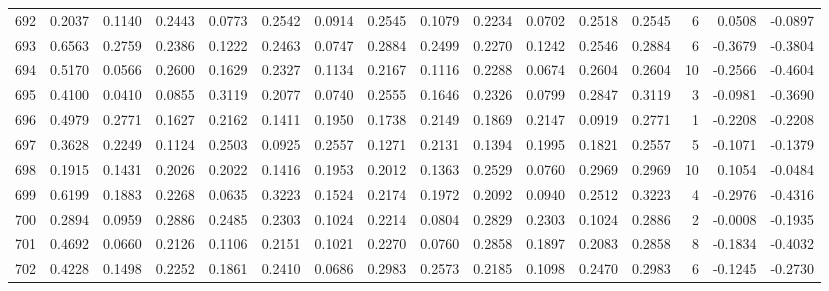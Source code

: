\begin{tabular}{lrrrrrrrrrrrrrrr}
692 &      0.2037 &  0.1140 &  0.2443 &  0.0773 &  0.2542 &  0.0914 &  0.2545 &  0.1079 &  0.2234 &  0.0702 &   0.2518 &     0.2545 &      6 &                    0.0508 &                    -0.0897 \\
693 &      0.6563 &  0.2759 &  0.2386 &  0.1222 &  0.2463 &  0.0747 &  0.2884 &  0.2499 &  0.2270 &  0.1242 &   0.2546 &     0.2884 &      6 &                   -0.3679 &                    -0.3804 \\
694 &      0.5170 &  0.0566 &  0.2600 &  0.1629 &  0.2327 &  0.1134 &  0.2167 &  0.1116 &  0.2288 &  0.0674 &   0.2604 &     0.2604 &     10 &                   -0.2566 &                    -0.4604 \\
695 &      0.4100 &  0.0410 &  0.0855 &  0.3119 &  0.2077 &  0.0740 &  0.2555 &  0.1646 &  0.2326 &  0.0799 &   0.2847 &     0.3119 &      3 &                   -0.0981 &                    -0.3690 \\
696 &      0.4979 &  0.2771 &  0.1627 &  0.2162 &  0.1411 &  0.1950 &  0.1738 &  0.2149 &  0.1869 &  0.2147 &   0.0919 &     0.2771 &      1 &                   -0.2208 &                    -0.2208 \\
697 &      0.3628 &  0.2249 &  0.1124 &  0.2503 &  0.0925 &  0.2557 &  0.1271 &  0.2131 &  0.1394 &  0.1995 &   0.1821 &     0.2557 &      5 &                   -0.1071 &                    -0.1379 \\
698 &      0.1915 &  0.1431 &  0.2026 &  0.2022 &  0.1416 &  0.1953 &  0.2012 &  0.1363 &  0.2529 &  0.0760 &   0.2969 &     0.2969 &     10 &                    0.1054 &                    -0.0484 \\
699 &      0.6199 &  0.1883 &  0.2268 &  0.0635 &  0.3223 &  0.1524 &  0.2174 &  0.1972 &  0.2092 &  0.0940 &   0.2512 &     0.3223 &      4 &                   -0.2976 &                    -0.4316 \\
700 &      0.2894 &  0.0959 &  0.2886 &  0.2485 &  0.2303 &  0.1024 &  0.2214 &  0.0804 &  0.2829 &  0.2303 &   0.1024 &     0.2886 &      2 &                   -0.0008 &                    -0.1935 \\
701 &      0.4692 &  0.0660 &  0.2126 &  0.1106 &  0.2151 &  0.1021 &  0.2270 &  0.0760 &  0.2858 &  0.1897 &   0.2083 &     0.2858 &      8 &                   -0.1834 &                    -0.4032 \\
702 &      0.4228 &  0.1498 &  0.2252 &  0.1861 &  0.2410 &  0.0686 &  0.2983 &  0.2573 &  0.2185 &  0.1098 &   0.2470 &     0.2983 &      6 &                   -0.1245 &                    -0.2730 \\

\end{tabular}
